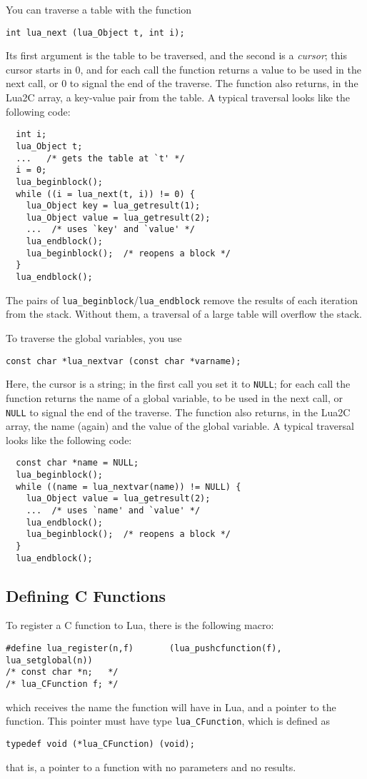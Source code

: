 \documentclass[11pt]{article}
\newcommand{\Deffunc}[1]{\index{#1}}
\begin{document}
You can traverse a table with the function \Deffunc{lua_next}
\begin{verbatim}
int lua_next (lua_Object t, int i);
\end{verbatim}
Its first argument is the table to be traversed,
and the second is a \emph{cursor};
this cursor starts in 0,
and for each call the function returns a value to
be used in the next call,
or 0 to signal the end of the traverse.
The function also returns, in the Lua2C array,
a key-value pair from the table.
A typical traversal looks like the following code:
\begin{verbatim}
  int i;
  lua_Object t;
  ...   /* gets the table at `t' */
  i = 0;
  lua_beginblock();
  while ((i = lua_next(t, i)) != 0) {
    lua_Object key = lua_getresult(1);
    lua_Object value = lua_getresult(2);
    ...  /* uses `key' and `value' */
    lua_endblock();
    lua_beginblock();  /* reopens a block */
  }
  lua_endblock();
\end{verbatim}
The pairs of \verb|lua_beginblock|/\verb|lua_endblock| remove the
results of each iteration from the stack.
Without them, a traversal of a large table will overflow the stack.

To traverse the global variables, you use \Deffunc{lua_nextvar}
\begin{verbatim}
const char *lua_nextvar (const char *varname);
\end{verbatim}
Here, the cursor is a string;
in the first call you set it to \verb|NULL|;
for each call the function returns the name of a global variable,
to be used in the next call,
or \verb|NULL| to signal the end of the traverse.
The function also returns, in the Lua2C array,
the name (again) and the value of the global variable.
A typical traversal looks like the following code:
\begin{verbatim}
  const char *name = NULL;
  lua_beginblock();
  while ((name = lua_nextvar(name)) != NULL) {
    lua_Object value = lua_getresult(2);
    ...  /* uses `name' and `value' */
    lua_endblock();
    lua_beginblock();  /* reopens a block */
  }
  lua_endblock();
\end{verbatim}


\subsection{Defining C Functions} \label{LuacallC}
To register a C function to Lua,
there is the following macro:
\Deffunc{lua_register}
\begin{verbatim}
#define lua_register(n,f)       (lua_pushcfunction(f), lua_setglobal(n))
/* const char *n;   */
/* lua_CFunction f; */
\end{verbatim}
which receives the name the function will have in Lua,
and a pointer to the function.
This pointer must have type \verb|lua_CFunction|,
which is defined as
\Deffunc{lua_CFunction}
\begin{verbatim}
typedef void (*lua_CFunction) (void);
\end{verbatim}
that is, a pointer to a function with no parameters and no results.
\end{document}
